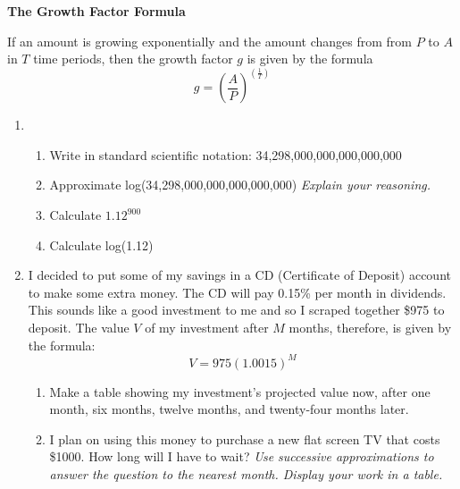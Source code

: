 \documentclass[12pt]{article}
\begin{document}
 \vspace{.2in}
 
 \begin{center}
\textbf{The Growth Factor Formula}
\vspace{.1in}

If an amount is growing exponentially and the amount changes from from $P$ to $A$ \\ in $T$ time periods, then the growth factor $g$ is given by the formula $$g=\left(\frac{A}{P}\right)^{\left(\frac{1}{T}\right)}$$

 \end{center}

\hrulefill

\newpage

\begin{enumerate}

\item \begin{enumerate}
\item Write in standard scientific notation:  34,298,000,000,000,000,000
\vfill
\item Approximate log(34,298,000,000,000,000,000)  \emph{Explain your reasoning.}
\vfill
\item Calculate $1.12^{900}$
\vfill
\item Calculate log(1.12)
\vfill
\end{enumerate}

\newpage

\item I decided to put some of my savings in a CD (Certificate of Deposit) account to make some extra money.  The CD will pay 0.15\% per month in dividends.  This sounds like a good investment to me and so I scraped together \$975 to deposit.  The value $V$ of my investment after $M$ months, therefore, is given by the formula: $$V=975(1.0015)^M$$

\begin{enumerate}
\item Make a table showing my investment's projected value now, after one month, six months, twelve months, and twenty-four months later.
\vfill
\item I plan on using this money to purchase a new flat screen TV that costs \$1000.  How long will I have to wait?  \emph{Use successive approximations to answer the question to the nearest month.  Display your work in a table.}
\vfill
\vfill
\vfill
\end{enumerate}


\end{enumerate}
\end{document}
